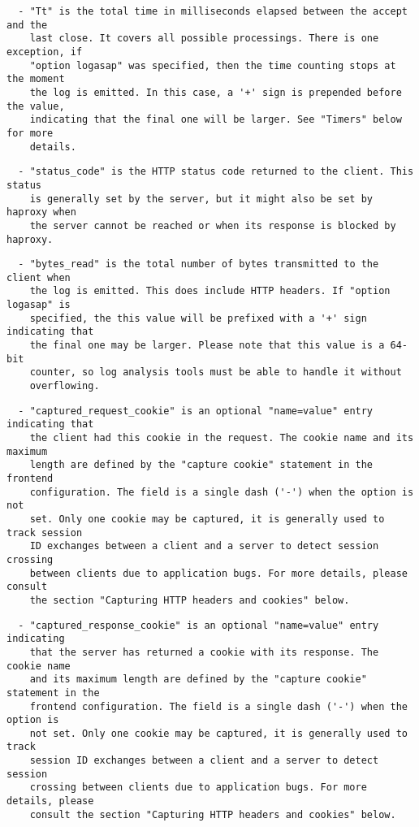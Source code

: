 \begin{verbatim}
  - "Tt" is the total time in milliseconds elapsed between the accept and the
    last close. It covers all possible processings. There is one exception, if
    "option logasap" was specified, then the time counting stops at the moment
    the log is emitted. In this case, a '+' sign is prepended before the value,
    indicating that the final one will be larger. See "Timers" below for more
    details.
\end{verbatim}

\begin{verbatim}
  - "status_code" is the HTTP status code returned to the client. This status
    is generally set by the server, but it might also be set by haproxy when
    the server cannot be reached or when its response is blocked by haproxy.
\end{verbatim}

\begin{verbatim}
  - "bytes_read" is the total number of bytes transmitted to the client when
    the log is emitted. This does include HTTP headers. If "option logasap" is
    specified, the this value will be prefixed with a '+' sign indicating that
    the final one may be larger. Please note that this value is a 64-bit
    counter, so log analysis tools must be able to handle it without
    overflowing.
\end{verbatim}

\begin{verbatim}
  - "captured_request_cookie" is an optional "name=value" entry indicating that
    the client had this cookie in the request. The cookie name and its maximum
    length are defined by the "capture cookie" statement in the frontend
    configuration. The field is a single dash ('-') when the option is not
    set. Only one cookie may be captured, it is generally used to track session
    ID exchanges between a client and a server to detect session crossing
    between clients due to application bugs. For more details, please consult
    the section "Capturing HTTP headers and cookies" below.
\end{verbatim}

\begin{verbatim}
  - "captured_response_cookie" is an optional "name=value" entry indicating
    that the server has returned a cookie with its response. The cookie name
    and its maximum length are defined by the "capture cookie" statement in the
    frontend configuration. The field is a single dash ('-') when the option is
    not set. Only one cookie may be captured, it is generally used to track
    session ID exchanges between a client and a server to detect session
    crossing between clients due to application bugs. For more details, please
    consult the section "Capturing HTTP headers and cookies" below.
\end{verbatim}

